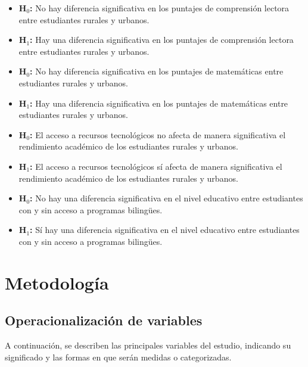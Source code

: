 \documentclass[
]{article}
\begin{document}
\begin{itemize}
    \item \textbf{H$_{0}$:} No hay diferencia significativa en los puntajes de comprensión lectora entre estudiantes rurales y urbanos.
    \item \textbf{H$_{1}$:} Hay una diferencia significativa en los puntajes de comprensión lectora entre estudiantes rurales y urbanos.
    \item \textbf{H$_{0}$:} No hay diferencia significativa en los puntajes de matemáticas entre estudiantes rurales y urbanos.
    \item \textbf{H$_{1}$:} Hay una diferencia significativa en los puntajes de matemáticas entre estudiantes rurales y urbanos.
    \item \textbf{H$_{0}$:} El acceso a recursos tecnológicos no afecta de manera significativa el rendimiento académico de los estudiantes rurales y urbanos.
    \item \textbf{H$_{1}$:} El acceso a recursos tecnológicos sí afecta de manera significativa el rendimiento académico de los estudiantes rurales y urbanos.
    \item \textbf{H$_{0}$:} No hay una diferencia significativa en el nivel educativo entre estudiantes con y sin acceso a programas bilingües.
    \item \textbf{H$_{1}$:} Sí hay una diferencia significativa en el nivel educativo entre estudiantes con y sin acceso a programas bilingües.
\end{itemize}

\section*{Metodología}\label{metodologuxeda}

\subsection*{Operacionalización de
variables}\label{operacionalizaciuxf3n-de-variables}

A continuación, se describen las principales variables del estudio,
indicando su significado y las formas en que serán medidas o
categorizadas.
\end{document}
